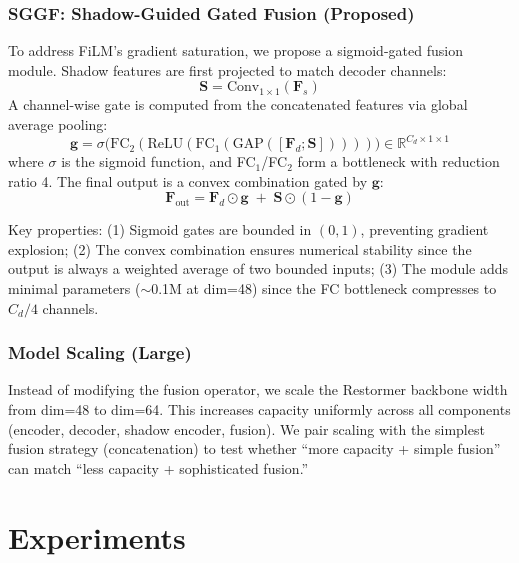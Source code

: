 \documentclass[11pt]{article}
\begin{document}
\subsubsection{SGGF: Shadow-Guided Gated Fusion (Proposed)}

To address FiLM's gradient saturation, we propose a sigmoid-gated fusion module.
Shadow features are first projected to match decoder channels:
\begin{equation}
  \mathbf{S} = \text{Conv}_{1\times1}(\mathbf{F}_s)
\end{equation}
A channel-wise gate is computed from the concatenated features via global average pooling:
\begin{equation}
  \mathbf{g} = \sigma\big(\text{FC}_2(\text{ReLU}(\text{FC}_1(\text{GAP}([\mathbf{F}_d; \mathbf{S}]))))\big) \in \mathbb{R}^{C_d \times 1 \times 1}
\end{equation}
where $\sigma$ is the sigmoid function, and FC$_1$/FC$_2$ form a bottleneck with reduction ratio 4.
The final output is a convex combination gated by $\mathbf{g}$:
\begin{equation}
  \mathbf{F}_{\text{out}} = \mathbf{F}_d \odot \mathbf{g} \;+\; \mathbf{S} \odot (1 - \mathbf{g})
\end{equation}

Key properties: (1) Sigmoid gates are bounded in $(0,1)$, preventing gradient explosion; (2) The convex combination ensures numerical stability since the output is always a weighted average of two bounded inputs; (3) The module adds minimal parameters ($\sim$0.1M at dim=48) since the FC bottleneck compresses to $C_d/4$ channels.

\subsubsection{Model Scaling (Large)}

Instead of modifying the fusion operator, we scale the Restormer backbone width from dim=48 to dim=64.
This increases capacity uniformly across all components (encoder, decoder, shadow encoder, fusion).
We pair scaling with the simplest fusion strategy (concatenation) to test whether ``more capacity + simple fusion'' can match ``less capacity + sophisticated fusion.''

\section{Experiments}
\end{document}
